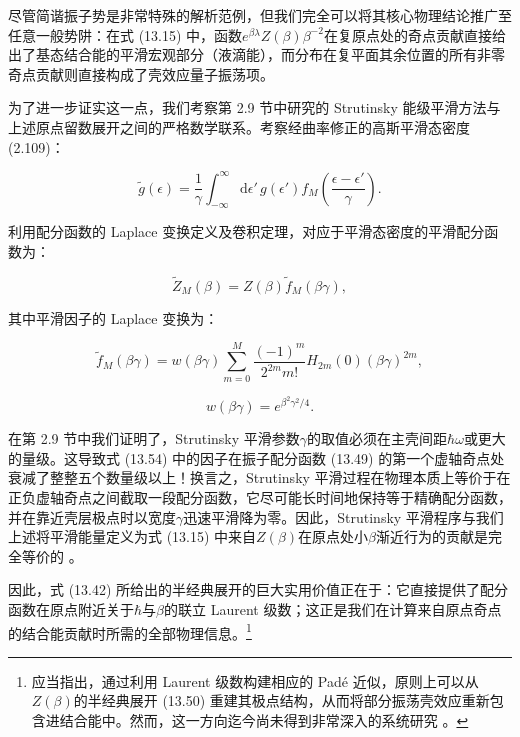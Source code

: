 尽管简谐振子势是非常特殊的解析范例，但我们完全可以将其核心物理结论推广至任意一般势阱：在式 (13.15) 中，函数$e^{\beta\lambda}Z(\beta)\beta^{-2}$在复原点处的奇点贡献直接给出了基态结合能的平滑宏观部分（液滴能），而分布在复平面其余位置的所有非零奇点贡献则直接构成了壳效应量子振荡项。

为了进一步证实这一点，我们考察第 2.9 节中研究的 Strutinsky 能级平滑方法与上述原点留数展开之间的严格数学联系。考察经曲率修正的高斯平滑态密度
(2.109)：

\[
\tilde{g}(\epsilon)=\frac{1}{\gamma}\int^{\infty}_{-\infty}\mathrm{d}\epsilon'\,g(\epsilon')f_{M}\left(\frac{\epsilon-\epsilon'}{\gamma}\right).
\]

利用配分函数的 Laplace 变换定义及卷积定理，对应于平滑态密度的平滑配分函数为：

\[
\tilde{Z}_{M}(\beta)=Z(\beta)\tilde{f}_{M}(\beta\gamma),
\]

其中平滑因子的 Laplace 变换为：

\[
\tilde{f}_{M}(\beta\gamma)=w(\beta\gamma)\sum^{M}_{m=0}\frac{(-1)^{m}}{2^{2m}m!}H_{2m}(0)(\beta\gamma)^{2m},
\]

\[
w(\beta\gamma)=e^{\beta^{2}\gamma^{2}/4}.
\]

在第 2.9 节中我们证明了，Strutinsky 平滑参数$\gamma$的取值必须在主壳间距$\hbar\omega$或更大的量级。这导致式
(13.54) 中的因子在振子配分函数 (13.49) 的第一个虚轴奇点处衰减了整整五个数量级以上！换言之，Strutinsky 平滑过程在物理本质上等价于在正负虚轴奇点之间截取一段配分函数，它尽可能长时间地保持等于精确配分函数，并在靠近壳层极点时以宽度$\gamma$迅速平滑降为零。因此，Strutinsky
平滑程序与我们上述将平滑能量定义为式 (13.15) 中来自$Z(\beta)$在原点处小$\beta$渐近行为的贡献是完全等价的
\cite{Je73,Je76}。

因此，式 (13.42) 所给出的半经典展开的巨大实用价值正在于：它直接提供了配分函数在原点附近关于$\hbar$与$\beta$的联立
Laurent 级数；这正是我们在计算来自原点奇点的结合能贡献时所需的全部物理信息。\footnote{应当指出，通过利用 Laurent 级数构建相应的 Padé 近似，原则上可以从$Z(\beta)$的半经典展开 (13.50)
重建其极点结构，从而将部分振荡壳效应重新包含进结合能中。然而，这一方向迄今尚未得到非常深入的系统研究 \cite{GS77}。}

